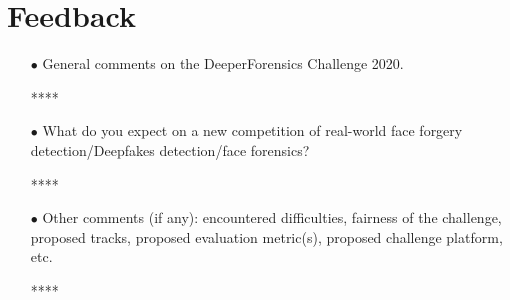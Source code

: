 \documentclass[runningheads]{llncs}
\begin{document}
\section{Feedback}
\begin{spacing}{1.5}
\begin{itemize}

\item[$\bullet$] General comments on the DeeperForensics Challenge 2020.

****

\item[$\bullet$] What do you expect on a new competition of real-world face forgery detection/Deepfakes detection/face forensics?

****

\item[$\bullet$] Other comments (if any): encountered difficulties, fairness of the challenge, proposed tracks, proposed evaluation metric(s), proposed challenge platform, etc.

****

\end{itemize}
\end{spacing}




\end{document}

